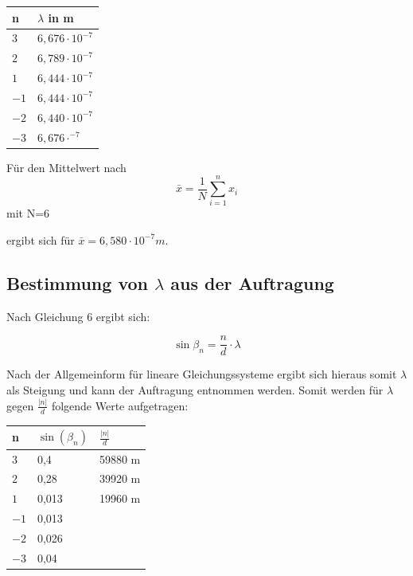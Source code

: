 \documentclass[12pt,a4paper,titlepage,headinclude,bibtotoc]{scrartcl}
\begin{document}
\begin{table} [h]
\centering
\begin{tabular}{|p{4 cm}||p{4 cm}|}
        \hline
		n& $\lambda$ in m\\
         \hline 
         $3$ & $6,676\cdot10^{-7}$  \\
         \hline
         $2$ & $6,789\cdot10^{-7}$\\
         \hline
         $1$ & $6,444\cdot10^{-7}$ \\
         \hline
         $-1$ & $6,444\cdot10^{-7}$ \\
         \hline
         $-2$ & $6,440\cdot10^{-7}$ \\
         \hline             
         $-3$ & $6,676\cdot^{-7}$ \\
         \hline
\end{tabular}
\end{table}

Für den Mittelwert nach
\[\bar{x} =\frac{1}{N}\sum_{i=1}^n x_i\] mit N=6

ergibt sich für $\bar{x} = 6,580\cdot10^{-7} m $.

\subsection{Bestimmung von $\lambda$ aus der Auftragung}

Nach Gleichung 6 ergibt sich:

\begin{equation}
\sin\beta_n = \frac{n}{d}\cdot \lambda
\end{equation}

Nach der Allgemeinform für lineare Gleichungssysteme ergibt sich hieraus somit $\lambda$ als Steigung und kann der Auftragung entnommen werden. Somit werden für ${\lambda}$ gegen $\frac{|n|}{d}$ folgende Werte aufgetragen:

\begin{table} [h]
\centering
\begin{tabular}{|p{4 cm}||p{4 cm}|p{4 cm}|}
        \hline
		n & $\sin(\beta_n)$ & $\frac{|n|}{d}$\\
         \hline 
         $3$ & 0,4 & 59880 m  \\
         \hline
         $2$ & 0,28 & 39920 m \\
         \hline
         $1$ & 0,013 & 19960 m\\
         \hline
         $-1$ & 0,013 &    \\
         \hline
         $-2$ & 0,026 &    \\
         \hline             
         $-3$ & 0,04 &    \\
         \hline
\end{tabular}
\end{table}
\end{document}
